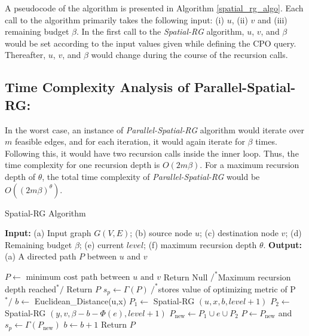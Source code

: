 A pseudocode of the algorithm is presented in Algorithm \ref{spatial_rg_algo}. Each call to the algorithm primarily takes the following input: (i)  $u$, (ii)  $v$ and (iii) remaining budget $\beta$. In the first call to the \textit{Spatial-RG} algorithm, $u$, $v$, and $\beta$ would be set according to the input values given while defining the CPO query. Thereafter, $u$, $v$, and $\beta$ would change during the course of the recursion calls.

\subsection{Time Complexity Analysis of Parallel-Spatial-RG:}

In the worst case, an instance of \textit{Parallel-Spatial-RG} algorithm would iterate over $m$ feasible edges, and for each iteration, it would again iterate for $\beta$ times. Following this, it would have two recursion calls inside the inner loop. Thus, the time complexity for one recursion depth is $O(2m\beta)$. For a maximum recursion depth of $\theta$, the total time complexity of \textit{Parallel-Spatial-RG} would be $O((2m\beta)^\theta )$.

\begin{algorithm}
\caption{Spatial-RG Algorithm} \label{spatial_rg_algo}
\textbf{Input: }(a) Input graph $G(V, E)$; (b) source node $u$; (c) destination node $v$; (d) Remaining budget $\beta$; (e) current $level$; (f) maximum recursion depth $\theta$.\newline
\textbf{Output: }(a) A directed path $P$ between $u$ and $v$\newline
\begin{algorithmic}[1]
\State $P \leftarrow \textrm{ minimum cost path between } u \textrm{ and } v$
    \State Return Null
\EndIf
{} $/^*$Maximum recursion depth reached$^*/$
    \State Return $P$
\EndIf
\State $s_p \leftarrow \Gamma(P)~/^*$stores value of optimizing metric of P $^*/$
    \State $b \leftarrow$ Euclidean\_Distance(u,x)
        \State $P_1 \leftarrow$ Spatial-RG $(u, x, b, level + 1)$
        \State $P_2 \leftarrow$ Spatial-RG $(y, v, \beta - b - \Phi (e), level + 1)$
        \State $P_\mathrm{new} \leftarrow P_1 \cup e \cup P_2$
            \State $P \leftarrow P_\mathrm{new}$ and $s_p \leftarrow \Gamma(P_\mathrm{new})$
        \EndIf
        \State $b \leftarrow b+1$
    \EndWhile
\EndFor
\State Return $P$
\end{algorithmic}
\end{algorithm}